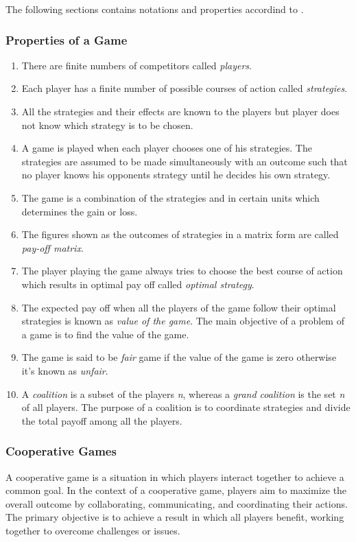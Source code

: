 The following sections contains notations and properties accordind to \cite{game_theory:2020}.

\subsubsection{Properties of a Game}
\begin{enumerate}
    \item {There are finite numbers of competitors called \textit{players}.}
    \item {Each player has a finite number of possible courses of action called \textit{strategies}.}
    \item {All the strategies and their effects are known to the players but player does not know which
    strategy is to be chosen.}
    \item {A game is played when each player chooses one of his strategies. The strategies are assumed
    to be made simultaneously with an outcome such that no player knows his opponents strategy
    until he decides his own strategy.}
    \item {The game is a combination of the strategies and in certain units which determines the gain or
    loss.}
    \item {The figures shown as the outcomes of strategies in a matrix form are called \textit{pay-off matrix}.}
    \item {The player playing the game always tries to choose the best course of action which results in
    optimal pay off called \textit{optimal strategy}.}
    \item {The expected pay off when all the players of the game follow their optimal strategies is
    known as \textit{value of the game}. The main objective of a problem of a game is to find the value
    of the game.}
    \item {The game is said to be \textit{fair} game if the value of the game is zero otherwise it's known as \textit{unfair}.}
    \item {A \textit{coalition} is a subset of the players \textit{n}, whereas a \textit{grand coalition} is the
        set \textit{n} of all players. The purpose of a coalition is to coordinate strategies and divide the
        total payoff among all the players.}
\end{enumerate}


\subsubsection{Cooperative Games}
A cooperative game is a situation in which players interact together to achieve a common goal.
In the context of a cooperative game, players aim to maximize the overall outcome by collaborating, communicating, and coordinating their actions.
The primary objective is to achieve a result in which all players benefit, working together to overcome challenges or issues.


